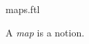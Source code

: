 \documentclass{stex}
\begin{document}
\begin{smodule}{maps.ftl}


\begin{fakeforthel}
  \begin{signature}
    A \emph{map} is a notion.
  \end{signature}
\end{fakeforthel}

\end{smodule}
\end{document}
